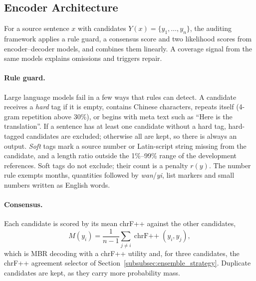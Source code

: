 \documentclass[11pt]{article}
\begin{document}
\subsection{Encoder Architecture}
\label{subsec:encoder}
For a source sentence $x$ with candidates $Y(x)=\{y_1,\dots,y_n\}$, the auditing framework applies a rule guard, a consensus score and two likelihood scores from encoder--decoder models, and combines them linearly. A coverage signal from the same models explains omissions and triggers repair.

\paragraph{Rule guard.}
Large language models fail in a few ways that rules can detect. A candidate receives a \emph{hard} tag if it is empty, contains Chinese characters, repeats itself (4-gram repetition above 30\%), or begins with meta text such as ``Here is the translation''. If a sentence has at least one candidate without a hard tag, hard-tagged candidates are excluded; otherwise all are kept, so there is always an output. \emph{Soft} tags mark a source number or Latin-script string missing from the candidate, and a length ratio outside the 1\%--99\% range of the development references. Soft tags do not exclude; their count is a penalty $r(y)$. The number rule exempts months, quantities followed by \emph{wan}/\emph{yi}, list markers and small numbers written as English words.

\paragraph{Consensus.}
Each candidate is scored by its mean chrF++ against the other candidates,
\[
M(y_i)=\frac{1}{n-1}\sum_{j\ne i}\operatorname{chrF++}(y_i,y_j),
\]
which is MBR decoding with a chrF++ utility and, for three candidates, the chrF++ agreement selector of Section~\ref{subsubsec:ensemble_strategy}. Duplicate candidates are kept, as they carry more probability mass.
\end{document}
